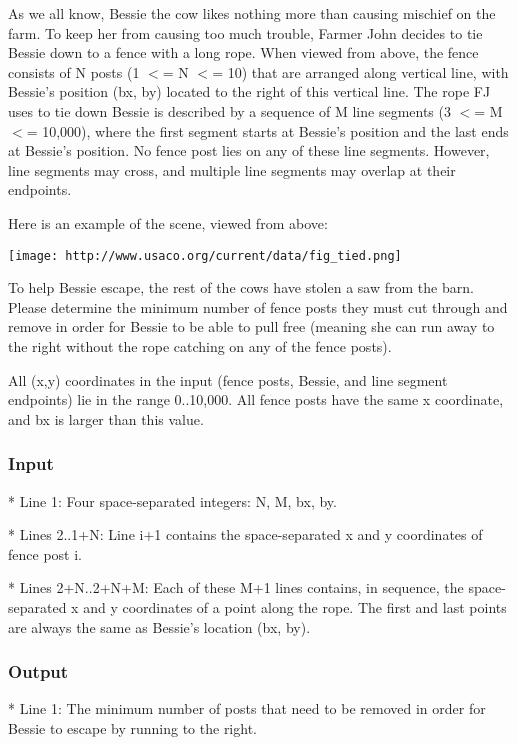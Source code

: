 

As we all know, Bessie the cow likes nothing more than causing mischief on the farm.  To keep her from causing too much trouble, Farmer John decides to tie Bessie down to a fence with a long rope.  When viewed from above, the fence consists of N posts (1 $<$= N $<$= 10) that are arranged along vertical line, with Bessie's position (bx, by) located to the right of this vertical line.  The rope FJ uses to tie down Bessie is described by a sequence of M line segments (3 $<$= M $<$= 10,000), where the first segment starts at Bessie's position and the last ends at Bessie's position. No fence post lies on any of these line segments.  However, line segments may cross, and multiple line segments may overlap at their endpoints.

Here is an example of the scene, viewed from above:


\texttt{[image: http://www.usaco.org/current/data/fig\_tied.png]}

To help Bessie escape, the rest of the cows have stolen a saw from the barn.  Please determine the minimum number of fence posts they must cut through and remove in order for Bessie to be able to pull free (meaning she can run away to the right without the rope catching on any of the fence posts).

All (x,y) coordinates in the input (fence posts, Bessie, and line segment endpoints) lie in the range 0..10,000.  All fence posts have the same x coordinate, and bx is larger than this value.

\subsubsection{Input}

* Line 1: Four space-separated integers: N, M, bx, by.

* Lines 2..1+N: Line i+1 contains the space-separated x and y         coordinates of fence post i.

* Lines 2+N..2+N+M: Each of these M+1 lines contains, in sequence, the         space-separated x and y coordinates of a point along the rope.         The first and last points are always the same as Bessie's         location (bx, by).

\subsubsection{Output}

* Line 1: The minimum number of posts that need to be removed in order         for Bessie to escape by running to the right.

